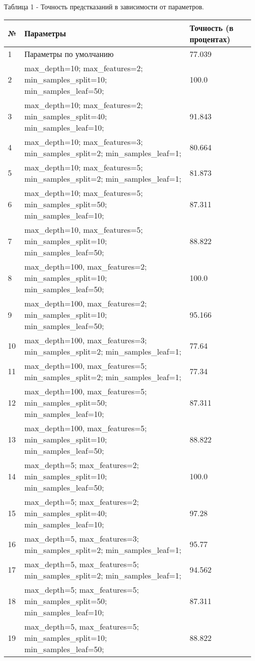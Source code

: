 \documentclass[a4paper,12pt]{article}
\begin{document}
	\vspace{0.5cm}
	Таблица 1 - Точность предстказаний в зависимости от параметров.
\begin{longtable}{|p{1cm}|p{9cm}|p{3cm}|}
\hline
№ & Параметры & Точность (в процентах) \\ 
\hline 
1 & Параметры по умолчанию & 77.039 \\
\hline
2 & max\_depth=10; max\_features=2; min\_samples\_split=10; min\_samples\_leaf=50; & 100.0 \\
\hline 
3 & max\_depth=10; max\_features=2; min\_samples\_split=40; min\_samples\_leaf=10; & 91.843 \\
\hline 
4 & max\_depth=10; max\_features=3; min\_samples\_split=2; min\_samples\_leaf=1; & 80.664 \\
\hline 
5 & max\_depth=10; max\_features=5; min\_samples\_split=2; min\_samples\_leaf=1; & 81.873 \\
\hline
6 & max\_depth=10; max\_features=5; min\_samples\_split=50; min\_samples\_leaf=10; & 87.311 \\
\hline  
7 & max\_depth=10, max\_features=5; min\_samples\_split=10; min\_samples\_leaf=50; & 88.822 \\
\hline
8 & max\_depth=100, max\_features=2; min\_samples\_split=10; min\_samples\_leaf=50; & 100.0 \\
\hline 
9 & max\_depth=100, max\_features=2; min\_samples\_split=10; min\_samples\_leaf=50; & 95.166 \\
\hline
10 & max\_depth=100, max\_features=3; min\_samples\_split=2; min\_samples\_leaf=1; & 77.64 \\
\hline
11 & max\_depth=100, max\_features=5; min\_samples\_split=2; min\_samples\_leaf=1; & 77.34 \\
\hline
12 & max\_depth=100, max\_features=5; min\_samples\_split=50; min\_samples\_leaf=10; & 87.311 \\
\hline
13 & max\_depth=100, max\_features=5; min\_samples\_split=10; min\_samples\_leaf=50; & 88.822 \\
\hline 
14 & max\_depth=5; max\_features=2; min\_samples\_split=10; min\_samples\_leaf=50; & 100.0 \\
\hline 
15 & max\_depth=5; max\_features=2; min\_samples\_split=40; min\_samples\_leaf=10;  & 97.28 \\
\hline 
16 & max\_depth=5, max\_features=3; min\_samples\_split=2; min\_samples\_leaf=1; & 95.77 \\
\hline
17 & max\_depth=5, max\_features=5; min\_samples\_split=2; min\_samples\_leaf=1; & 94.562 \\
\hline
18 & max\_depth=5; max\_features=5; min\_samples\_split=50; min\_samples\_leaf=10;  & 87.311 \\
\hline
19 & max\_depth=5, max\_features=5; min\_samples\_split=10; min\_samples\_leaf=50; & 88.822 \\
\hline 


\hline
\end{longtable}
\end{document}
